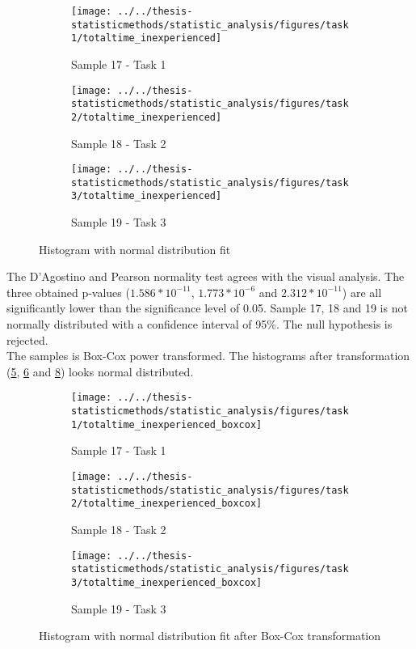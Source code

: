 \begin{figure}[H]
	\centering
	\begin{subfigure}[b]{0.32\textwidth}
		\centering
		\texttt{[image: ../../thesis-statisticmethods/statistic\_analysis/figures/task1/totaltime\_inexperienced]}
		\caption{Sample 17 - Task 1}
		\label{fig:totaltimeinexperienced_task1}
	\end{subfigure}
	\begin{subfigure}[b]{0.32\textwidth}
		\centering
		\texttt{[image: ../../thesis-statisticmethods/statistic\_analysis/figures/task2/totaltime\_inexperienced]}
		\caption{Sample 18 - Task 2}
		\label{fig:totaltimeinexperienced_task2}
	\end{subfigure}
	\begin{subfigure}[b]{0.32\textwidth}
		\centering
		\texttt{[image: ../../thesis-statisticmethods/statistic\_analysis/figures/task3/totaltime\_inexperienced]}
		\caption{Sample 19 - Task 3}
		\label{fig:totaltimeinexperienced_task3}
	\end{subfigure}
	\caption{Histogram with normal distribution fit}
\end{figure}

The D'Agostino and Pearson normality test agrees with the visual analysis. The three obtained p-values ($1.586 * 10^{-11}$, $1.773 * 10^{-6}$ and $2.312 * 10 ^{-11}$) are all significantly lower than the significance level of 0.05. Sample 17, 18 and 19 is not normally distributed with a confidence interval of 95\%. The null hypothesis is rejected. \\[0.2cm]

The samples is Box-Cox power transformed. The histograms after transformation (\ref{fig:totaltimeinexperiencedboxcox_task1}, \ref{fig:totaltimeinexperiencedboxcox_task2} and \ref{fig:totaltimeinexperiencedboxcox_task3}) looks normal distributed. 

\begin{figure}[H]
	\centering
	\begin{subfigure}[b]{0.32\textwidth}
		\centering
		\texttt{[image: ../../thesis-statisticmethods/statistic\_analysis/figures/task1/totaltime\_inexperienced\_boxcox]}
		\caption{Sample 17 - Task 1}
		\label{fig:totaltimeinexperiencedboxcox_task1}
	\end{subfigure}
	\begin{subfigure}[b]{0.32\textwidth}
		\centering
		\texttt{[image: ../../thesis-statisticmethods/statistic\_analysis/figures/task2/totaltime\_inexperienced\_boxcox]}
		\caption{Sample 18 - Task 2}
		\label{fig:totaltimeinexperiencedboxcox_task2}
	\end{subfigure}
	\begin{subfigure}[b]{0.32\textwidth}
		\centering
		\texttt{[image: ../../thesis-statisticmethods/statistic\_analysis/figures/task3/totaltime\_inexperienced\_boxcox]}
		\caption{Sample 19 - Task 3}
		\label{fig:totaltimeinexperiencedboxcox_task3}
	\end{subfigure}
	\caption{Histogram with normal distribution fit after Box-Cox transformation}
\end{figure}

